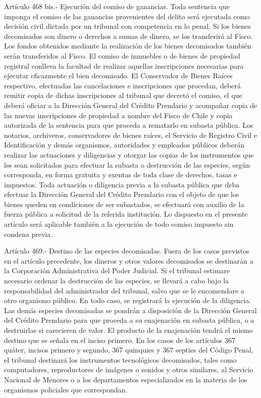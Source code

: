     Artículo 468 bis.- Ejecución del comiso de ganancias. Toda sentencia que imponga el comiso de las ganancias provenientes del delito será ejecutada como decisión civil dictada por un tribunal con competencia en lo penal.
    Si los bienes decomisados son dinero o derechos a sumas de dinero, se los transferirá al Fisco. Los fondos obtenidos mediante la realización de los bienes decomisados también serán transferidos al Fisco.
    El comiso de inmuebles o de bienes de propiedad registral conlleva la facultad de realizar aquellas inscripciones necesarias para ejecutar eficazmente el bien decomisado.
    El Conservador de Bienes Raíces respectivo, efectuadas las cancelaciones e inscripciones que procedan, deberá remitir copia de dichas inscripciones al tribunal que decretó el comiso, el que deberá oficiar a la Dirección General del Crédito Prendario y acompañar copia de las nuevas inscripciones de propiedad a nombre del Fisco de Chile y copia autorizada de la sentencia para que proceda a rematarlo en subasta pública.
    Los notarios, archiveros, conservadores de bienes raíces, el Servicio de Registro Civil e Identificación y demás organismos, autoridades y empleados públicos deberán realizar las actuaciones y diligencias y otorgar las copias de los instrumentos que les sean solicitados para efectuar la subasta o destrucción de las especies, según corresponda, en forma gratuita y exentas de toda clase de derechos, tasas e impuestos.
    Toda actuación o diligencia previa a la subasta pública que deba efectuar la Dirección General del Crédito Prendario con el objeto de que los bienes queden en condiciones de ser subastados, se efectuará con auxilio de la fuerza pública a solicitud de la referida institución.
    Lo dispuesto en el presente artículo será aplicable también a la ejecución de todo comiso impuesto sin condena previa.

    Artículo 469.- Destino de las especies decomisadas. Fuera de los casos previstos en el artículo precedente, los dineros y otros valores decomisados se destinarán a la Corporación Administrativa del Poder Judicial.
    Si el tribunal estimare necesario ordenar la destrucción de las especies, se llevará a cabo bajo la responsabilidad del administrador del tribunal, salvo que se le encomendare a otro organismo público. En todo caso, se registrará la ejecución de la diligencia.
    Las demás especies decomisadas se pondrán a disposición de la Dirección General del Crédito Prendario para que proceda a su enajenación en subasta pública, o a destruirlas si carecieren de valor. El producto de la enajenación tendrá el mismo destino que se señala en el inciso primero.
    En los casos de los artículos 367 quáter, incisos primero y segundo, 367 quinquies y 367 septies del Código Penal, el tribunal destinará los instrumentos tecnológicos decomisados, tales como computadores, reproductores de imágenes o sonidos y otros similares, al Servicio Nacional de Menores o a los departamentos especializados en la materia de los organismos policiales que correspondan.

